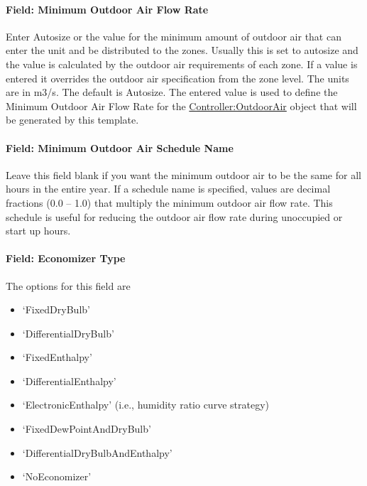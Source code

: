 \paragraph{Field: Minimum Outdoor Air Flow Rate}\label{field-minimum-outdoor-air-flow-rate-1}

Enter Autosize or the value for the minimum amount of outdoor air that can enter the unit and be distributed to the zones. Usually this is set to autosize and the value is calculated by the outdoor air requirements of each zone. If a value is entered it overrides the outdoor air specification from the zone level. The units are in m3/s. The default is Autosize. The entered value is used to define the Minimum Outdoor Air Flow Rate for the \hyperref[controlleroutdoorair]{Controller:OutdoorAir} object that will be generated by this template.

\paragraph{Field: Minimum Outdoor Air Schedule Name}\label{field-minimum-outdoor-air-schedule-name-1}

Leave this field blank if you want the minimum outdoor air to be the same for all hours in the entire year. If a schedule name is specified, values are decimal fractions (0.0 -- 1.0) that multiply the minimum outdoor air flow rate. This schedule is useful for reducing the outdoor air flow rate during unoccupied or start up hours.

\paragraph{Field: Economizer Type}\label{field-economizer-type-1}

The options for this field are

\begin{itemize}
\item
  `FixedDryBulb'
\item
  `DifferentialDryBulb'
\item
  `FixedEnthalpy'
\item
  `DifferentialEnthalpy'
\item
  `ElectronicEnthalpy' (i.e., humidity ratio curve strategy)
\item
  `FixedDewPointAndDryBulb'
\item
  `DifferentialDryBulbAndEnthalpy'
\item
  `NoEconomizer'
\end{itemize}

